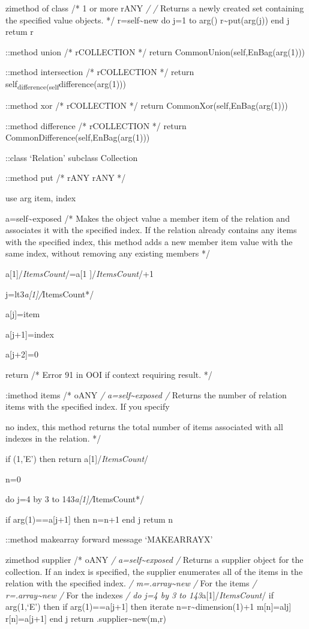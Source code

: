 zimethod of class /* 1 or more rANY \emph{/ /} Returns a newly created
set containing the specified value objects. */ r=self\textasciitilde new
do j=1 to arg() r\textasciitilde put(arg(j)) end j retum r

::method union /* rCOLLECTION */ return CommonUnion(self,EnBag(arg(1)))

::method intersection /* rCOLLECTION */ return
self\textsubscript{difference(self}difference(arg(1)))

::method xor /* rCOLLECTION */ return CommonXor(self,EnBag(arg(1)))

::method difference /* rCOLLECTION */ return
CommonDifference(self,EnBag(arg(1)))

::class `Relation' subclass Collection

::method put /* rANY rANY */

use arg item, index

a=self\textasciitilde exposed /* Makes the object value a member item of
the relation and associates it with the specified index. If the relation
already contains any items with the specified index, this method adds a
new member item value with the same index, without removing any existing
members */

a{[}1{]}/\emph{ItemsCount}/=a{[}1 {]}/\emph{ItemsCount}/+1

j=lt3\emph{a{[}1{]}/}ItemsCount*/

a{[}j{]}=item

a{[}j+1{]}=index

a{[}j+2{]}=0

return /* Error 91 in OOI if context requiring result. */

:imethod items /* oANY \emph{/ a=self\textasciitilde exposed /} Returns
the number of relation items with the specified index. If you specify

no index, this method returns the total number of items associated with
all indexes in the relation. */

if \arg(1,'E') then return a{[}1{]}/\emph{ItemsCount}/

n=0

do j=4 by 3 to 143\emph{a{[}1{]}/}ItemsCount*/

if arg(1)==a{[}j+1{]} then n=n+1 end j retum n

::method makearray forward message `MAKEARRAYX'

zimethod supplier /* oANY \emph{/ a=self\textasciitilde exposed /}
Returns a supplier object for the collection. If an index is specified,
the supplier enumerates all of the items in the relation with the
specified index. \emph{/ m=.array\textasciitilde new /} For the items
\emph{/ r=.array\textasciitilde new /} For the indexes \emph{/ do j=4 by
3 to 143}a{[}1{]}/\emph{ItemsCount}/ if arg(1,`E') then if
arg(1)==a{[}j+1{]} then iterate n=r\textasciitilde dimension(1)+1
m{[}n{]}=alj{]} r{[}n{]}=a{[}j+1{]} end j return
.supplier\textasciitilde new(m,r)

